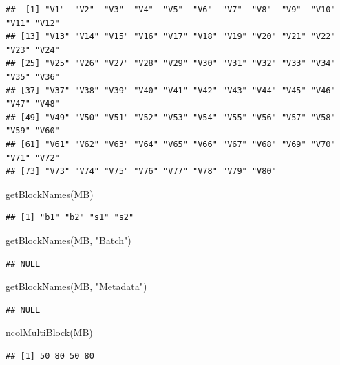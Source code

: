 \documentclass[
]{book}
\newenvironment{Shaded}{\begin{snugshade}}{\end{snugshade}}
\newcommand{\FunctionTok}[1]{\textcolor[rgb]{0.00,0.00,0.00}{#1}}
\newcommand{\NormalTok}[1]{#1}
\newcommand{\StringTok}[1]{\textcolor[rgb]{0.31,0.60,0.02}{#1}}
\begin{document}
\begin{verbatim}
##  [1] "V1"  "V2"  "V3"  "V4"  "V5"  "V6"  "V7"  "V8"  "V9"  "V10" "V11" "V12"
## [13] "V13" "V14" "V15" "V16" "V17" "V18" "V19" "V20" "V21" "V22" "V23" "V24"
## [25] "V25" "V26" "V27" "V28" "V29" "V30" "V31" "V32" "V33" "V34" "V35" "V36"
## [37] "V37" "V38" "V39" "V40" "V41" "V42" "V43" "V44" "V45" "V46" "V47" "V48"
## [49] "V49" "V50" "V51" "V52" "V53" "V54" "V55" "V56" "V57" "V58" "V59" "V60"
## [61] "V61" "V62" "V63" "V64" "V65" "V66" "V67" "V68" "V69" "V70" "V71" "V72"
## [73] "V73" "V74" "V75" "V76" "V77" "V78" "V79" "V80"
\end{verbatim}

\begin{Shaded}
\begin{Highlighting}[]
\FunctionTok{getBlockNames}\NormalTok{(MB)}
\end{Highlighting}
\end{Shaded}

\begin{verbatim}
## [1] "b1" "b2" "s1" "s2"
\end{verbatim}

\begin{Shaded}
\begin{Highlighting}[]
\FunctionTok{getBlockNames}\NormalTok{(MB, }\StringTok{"Batch"}\NormalTok{)}
\end{Highlighting}
\end{Shaded}

\begin{verbatim}
## NULL
\end{verbatim}

\begin{Shaded}
\begin{Highlighting}[]
\FunctionTok{getBlockNames}\NormalTok{(MB, }\StringTok{"Metadata"}\NormalTok{)}
\end{Highlighting}
\end{Shaded}

\begin{verbatim}
## NULL
\end{verbatim}

\begin{Shaded}
\begin{Highlighting}[]
\FunctionTok{ncolMultiBlock}\NormalTok{(MB)}
\end{Highlighting}
\end{Shaded}

\begin{verbatim}
## [1] 50 80 50 80
\end{verbatim}
\end{document}
